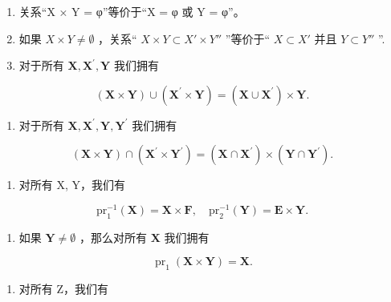 \begin{enumerate}
\def\labelenumi{(\alph{enumi})}
\item
  关系“X × Y = φ”等价于“X = φ 或 Y = φ”。
\item
  如果 \(X \times Y \neq \emptyset\) ，关系“ \(X \times Y \subset X' \times Y''\) ”等价于“ \(X \subset X'\) 并且 \(Y \subset Y''\) ''.
\item
  对于所有 \(\mathbf{X},\mathbf{X}^{\prime},\mathbf{Y}\) 我们拥有
\end{enumerate}

\[
(\mathbf {X} \times \mathbf {Y}) \cup (\mathbf {X} ^ {\prime} \times \mathbf {Y}) = (\mathbf {X} \cup \mathbf {X} ^ {\prime}) \times \mathbf {Y}.\tag{22}
\]

\begin{enumerate}
\def\labelenumi{(\alph{enumi})}
\setcounter{enumi}{3}
\tightlist
\item
  对于所有 \(\mathbf{X},\mathbf{X}^{\prime},\mathbf{Y},\mathbf{Y}^{\prime}\) 我们拥有
\end{enumerate}

\[
(\mathbf {X} \times \mathbf {Y}) \cap (\mathbf {X} ^ {\prime} \times \mathbf {Y} ^ {\prime}) = (\mathbf {X} \cap \mathbf {X} ^ {\prime}) \times (\mathbf {Y} \cap \mathbf {Y} ^ {\prime}).
\]

\begin{enumerate}
\def\labelenumi{(\alph{enumi})}
\setcounter{enumi}{4}
\tightlist
\item
  对所有 X, Y，我们有
\end{enumerate}

\[
\mathrm{pr} _ {1} ^ {- 1} (\mathbf {X}) = \mathbf {X} \times \mathbf {F}, \quad \mathrm{pr} _ {2} ^ {- 1} (\mathbf {Y}) = \mathbf {E} \times \mathbf {Y}.\tag{24}
\]

\begin{enumerate}
\def\labelenumi{(\alph{enumi})}
\setcounter{enumi}{5}
\tightlist
\item
  如果 \(\mathbf{Y} \neq \emptyset\) ，那么对所有 \(\mathbf{X}\) 我们拥有
\end{enumerate}

\[
\operatorname{pr} _ {1} (\mathbf {X} \times \mathbf {Y}) = \mathbf {X}.\tag{25}
\]

\begin{enumerate}
\def\labelenumi{(\alph{enumi})}
\setcounter{enumi}{6}
\tightlist
\item
  对所有 Z，我们有
\end{enumerate}

